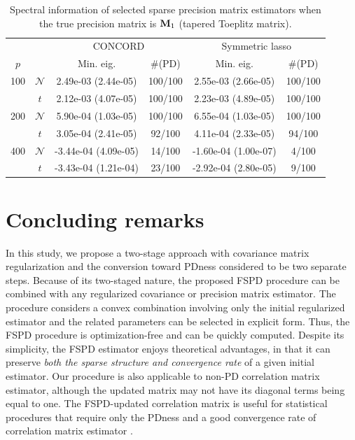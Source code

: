 \documentclass[times,sort&compress,3p]{elsarticle}
\begin{document}
\begin{table}[h]
{
\begin{center}
\begin{tabular}{cc|cc|cc}
\hline
& & \multicolumn{2}{c|}{CONCORD}& \multicolumn{2}{c}{Symmetric lasso} \\
$p$ & & Min. eig. & \#(PD) & Min. eig. & \#(PD)  \\
\hline
 100 & $\mathcal{N}$  & 2.49e-03 (2.44e-05) & 100/100 & 2.55e-03 (2.66e-05) & 100/100 \\
     & $t$  & 2.12e-03 (4.07e-05) & 100/100 & 2.23e-03 (4.89e-05) & 100/100 \\
\hline
 200 & $\mathcal{N}$  & 5.90e-04 (1.03e-05) & 100/100 & 6.55e-04 (1.03e-05) & 100/100 \\
     & $t$  & 3.05e-04 (2.41e-05) & 92/100 & 4.11e-04 (2.33e-05) & 94/100 \\
\hline
 400 & $\mathcal{N}$  & -3.44e-04 (4.09e-05) & 14/100 & -1.60e-04 (1.00e-07) & 4/100 \\
     & $t$  & -3.43e-04 (1.21e-04) & 23/100 & -2.92e-04 (2.80e-05) & 9/100 \\
\hline
\end{tabular}
\caption{Spectral information of selected sparse precision matrix estimators when the true precision matrix is
${\bf M}_1$ (tapered Toeplitz matrix).}
\end{center}
}
\label{table:precspectrum}
\end{table}


\section{Concluding remarks}\label{sec:concluding}

In this study, we propose a two-stage approach with covariance matrix regularization and the conversion toward
PDness considered to be two separate steps. Because of its two-staged nature, the proposed FSPD procedure can
 be combined with any regularized covariance or precision matrix estimator. The procedure considers a convex
 combination involving only the initial regularized estimator and the related parameters can be selected in explicit
 form. Thus, the FSPD procedure is optimization-free and can be quickly computed.
 Despite its simplicity, the FSPD estimator enjoys theoretical advantages, in that it can preserve {\it both the sparse structure and
 convergence rate} of a given initial estimator.
Our procedure is also applicable to non-PD correlation matrix estimator, although the updated matrix may not have its diagonal
 terms being equal to one. The FSPD-updated correlation matrix is useful for statistical procedures that require only the PDness and 
 a good convergence rate of correlation matrix estimator \citep{Kwon2016}.
\end{document}
